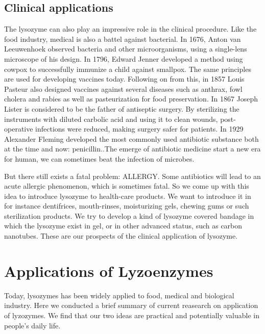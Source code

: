 \subsection{Clinical applications}
The lysozyme can also play an impressive role in the clinical procedure. Like the food industry, medical is also a battel against bacterial. In 1676, Anton van Leeuwenhoek observed bacteria and other microorganisms, using a single-lens microscope of his design.
In 1796, Edward Jenner developed a method using cowpox to successfully immunize a child against smallpox. The same principles are used for developing vaccines today.
Following on from this, in 1857 Louis Pasteur also designed vaccines against several diseases such as anthrax, fowl cholera and rabies as well as pasteurization for food preservation.
In 1867 Joseph Lister is considered to be the father of antiseptic surgery. By sterilizing the instruments with diluted carbolic acid and using it to clean wounds, post-operative infections were reduced, making surgery safer for patients.
In 1929 Alexander Fleming developed the most commonly used antibiotic substance both at the time and now: penicillin.\citep{Brock2003}.The emerge of antibiotic medicine start a new era for human, we can sometimes beat the infection of microbes.

But there still exists a fatal problem: ALLERGY. Some antibiotics will lead to an acute allergic phenomenon, which is sometimes fatal. So we come up with this idea to introduce lysozyme to health-care products. We want to introduce it in for instance dentifrices, mouth-rinses, moisturizing gels, chewing gums or such sterilization products.\citep{Tenovuo2002}
We try to develop a kind of lysozyme covered bandage in which the lysozyme exist in gel, or in other advanced status, such as carbon nanotubes.
These are our prospects of the clinical application of lysozyme.






\section{Applications of Lyzoenzymes}
Today, lysozymes has been widely applied to food, medical and biological industry. Here we conducted a brief summary of current reasearch on application of lyzozymes. We find that our two ideas are practical and potentially valuable in people's daily life.
 
